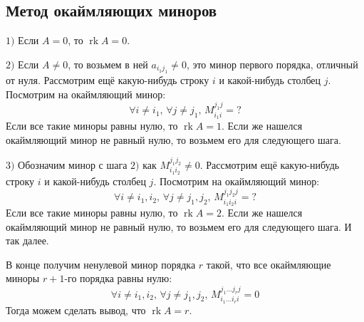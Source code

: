 \documentclass[12pt]{article}
\theoremstyle{definition}
\DeclareMathOperator{\rk}{\text{rk}}
\begin{document}
\subsection*{Метод окаймляющих миноров}

$1)$ Если $A = 0$, то $\rk{A} = 0$.

$2)$ Если $A \neq 0$, то возьмем в ней $a_{i_1 j_1} \neq 0$, это минор первого порядка, отличный от нуля. Рассмотрим ещё какую-нибудь строку $i$ и какой-нибудь столбец $j$. Посмотрим на окаймляющий минор:
$$
	\forall i \neq i_1, \, \forall j \neq j_1, \, M_{i_1 i}^{j_1 j} = ?
$$
Если все такие миноры равны нулю, то $\rk{A} = 1$. Если же нашелся окаймляющий минор не равный нулю, то возьмем его для следующего шага.

$3)$ Обозначим минор с шага $2)$ как $M_{i_1 i_2}^{j_1 j_2} \neq 0$. Рассмотрим ещё какую-нибудь строку $i$ и какой-нибудь столбец $j$. Посмотрим на окаймляющий минор:
$$
	\forall i \neq i_1,i_2, \, \forall j \neq j_1,j_2, \, M_{i_1 i_2 i}^{j_1 j_2 j} = ?
$$
Если все такие миноры равны нулю, то $\rk{A} = 2$. Если же нашелся окаймляющий минор не равный нулю, то возьмем его для следующего шага. И так далее. 

В конце получим ненулевой минор порядка $r$ такой, что все окаймляющие миноры $r+1$-го порядка равны нулю: 
$$
	\forall i \neq i_1,i_2, \, \forall j \neq j_1,j_2, \, M_{i_1 \dotsc i_r i}^{j_1 \dotsc j_r j} =0
$$
Тогда можем сделать вывод, что $\rk{A} = r$.
\end{document}
